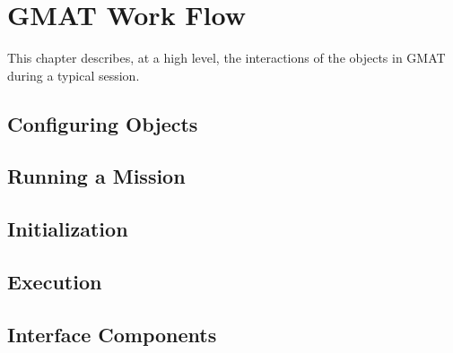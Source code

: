 \chapter{\label{chapter:WorkFlow}GMAT Work Flow}

This chapter describes, at a high level, the interactions of the objects in GMAT during a typical session.
\section{Configuring Objects}

\section{Running a Mission}

\section{Initialization}

\section{Execution}

\section{\label{section:InterfaceOverview}Interface Components}



